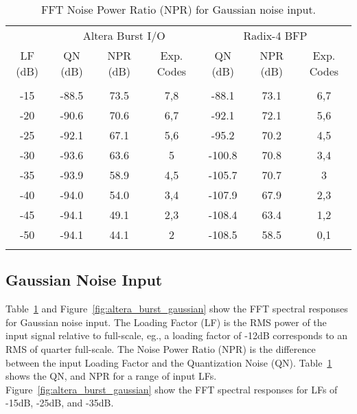 \clearpage
%
\begin{table}
\caption{FFT Noise Power Ratio (NPR) for Gaussian noise input.}
\label{tab:altera_burst_gaussian_npr}
\begin{center}
\begin{tabular}{|c||c|c|c||c|c|c|}
\hline
        & \multicolumn{3}{c|}{Altera Burst I/O}
        & \multicolumn{3}{c|}{Radix-4 BFP}\\
\cline{2-7}
LF (dB) & QN (dB) & NPR (dB) & Exp. Codes & QN (dB) & NPR (dB) & Exp. Codes\\
\hline\hline
&&&&&&\\
-15 & -88.5 & 73.5 & 7,8 &  -88.1 & 73.1 & 6,7\\
-20 & -90.6 & 70.6 & 6,7 &  -92.1 & 72.1 & 5,6\\
-25 & -92.1 & 67.1 & 5,6 &  -95.2 & 70.2 & 4,5\\
-30 & -93.6 & 63.6 & 5   & -100.8 & 70.8 & 3,4\\
-35 & -93.9 & 58.9 & 4,5 & -105.7 & 70.7 & 3\\
-40 & -94.0 & 54.0 & 3,4 & -107.9 & 67.9 & 2,3\\
-45 & -94.1 & 49.1 & 2,3 & -108.4 & 63.4 & 1,2\\
-50 & -94.1 & 44.1 & 2   & -108.5 & 58.5 & 0,1\\
&&&&&&\\
\hline
\end{tabular}
\end{center}
\end{table}

\subsection{Gaussian Noise Input}

Table~\ref{tab:altera_burst_gaussian_npr} and
Figure~\ref{fig:altera_burst_gaussian} show the FFT spectral responses for
Gaussian noise input.
%
The Loading Factor (LF) is the RMS power of the input signal relative to full-scale,
eg., a loading factor of -12dB corresponds to an RMS of quarter full-scale.
%
The Noise Power Ratio (NPR) is the difference between the input Loading Factor
and the Quantization Noise (QN).
%
Table~\ref{tab:altera_burst_gaussian_npr} shows the QN, and NPR for a range
of input LFs.
Figure~\ref{fig:altera_burst_gaussian} show the FFT spectral responses for
LFs of -15dB, -25dB, and -35dB.

